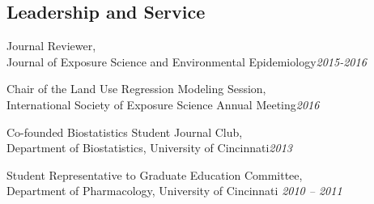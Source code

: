 \documentclass[margin,line]{res}
\newenvironment{list3}{
  \begin{list}{}{%
      \setlength{\itemsep}{0in}
      \setlength{\parsep}{0in} \setlength{\parskip}{0in}
      \setlength{\topsep}{0in} \setlength{\partopsep}{0in} 
      \setlength{\leftmargin}{0in}}}{\end{list}}
\begin{document}
\begin{resume}
\section{\sc Leadership and Service} 
\begin{list3} \itemsep 4pt     
\item[] Journal Reviewer, \\Journal of Exposure Science and Environmental Epidemiology\hfill \textit{2015-2016} 
\item[] Chair of the Land Use Regression Modeling Session, \\International Society of Exposure Science Annual Meeting\hfill \textit{2016} 
\item[] Co-founded Biostatistics Student Journal Club, \\Department of Biostatistics, University of Cincinnati\hfill \textit{2013} 
\item[] Student Representative to Graduate Education Committee, \\Department of Pharmacology, University of Cincinnati \hfill \textit{2010 -- 2011}
\end{list3}


\end{resume}
\end{document}
